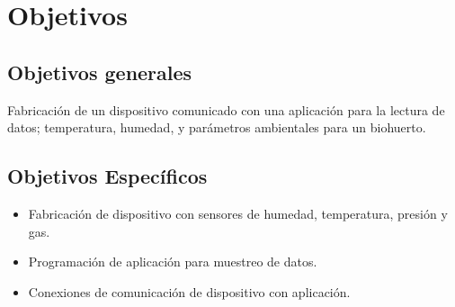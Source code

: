 \documentclass[../main]{subfiles}
\begin{document}
\section{Objetivos}

\subsection{Objetivos generales}

Fabricación de un dispositivo comunicado con una aplicación para la lectura de
datos; temperatura, humedad,  y parámetros ambientales para un biohuerto.

\subsection{Objetivos Específicos}

\begin{itemize}
	\item Fabricación de dispositivo con sensores de
	      humedad, temperatura, presión y gas.
	\item Programación de aplicación para muestreo de datos.
	\item Conexiones de comunicación de dispositivo con aplicación.
\end{itemize}
\end{document}
